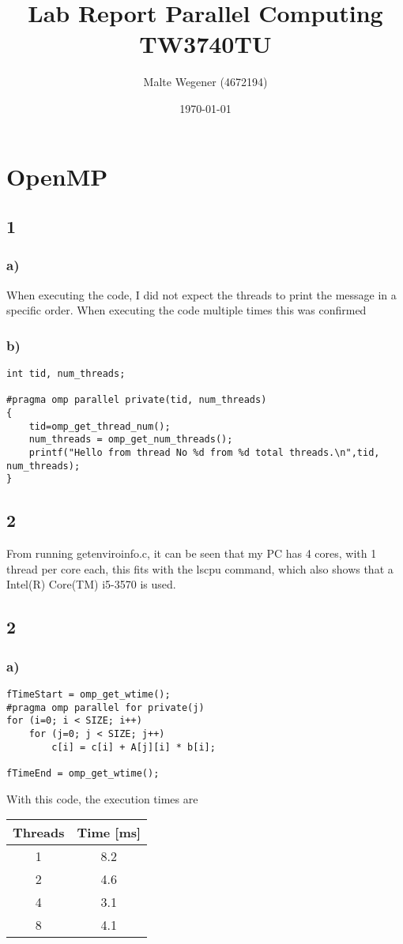 \documentclass{article}
\title{Lab Report Parallel Computing TW3740TU}
\author{Malte Wegener (4672194)}
\date{\today}
\begin{document}
\maketitle

\section{OpenMP}
\subsection{1}
\subsubsection{a)}
When executing the code, I did not expect the threads to print the message in a specific order. When executing the code multiple times this was confirmed

\subsubsection{b)}
\begin{lstlisting}
int tid, num_threads;

#pragma omp parallel private(tid, num_threads)
{
	tid=omp_get_thread_num();
	num_threads = omp_get_num_threads();
	printf("Hello from thread No %d from %d total threads.\n",tid, num_threads);
}

\end{lstlisting}

\subsection{2}
From running getenviroinfo.c, it can be seen that my PC has 4 cores, with 1 thread per core each, this fits with the lscpu command, which also shows that a Intel(R) Core(TM) i5-3570 is used.


\subsection{2}
\subsubsection{a)}
\begin{lstlisting}
fTimeStart = omp_get_wtime();
#pragma omp parallel for private(j)
for (i=0; i < SIZE; i++)
	for (j=0; j < SIZE; j++)
		c[i] = c[i] + A[j][i] * b[i];

fTimeEnd = omp_get_wtime();
\end{lstlisting}
With this code, the execution times are\\
\begin{center}
\begin{tabular}{c|c}
	Threads&Time [ms] \\ \hline
	1&8.2 \\ \hline
	2&4.6 \\ \hline
	4&3.1 \\ \hline
	8&4.1 \\ \hline
\end{tabular}
\end{center}
\end{document}
